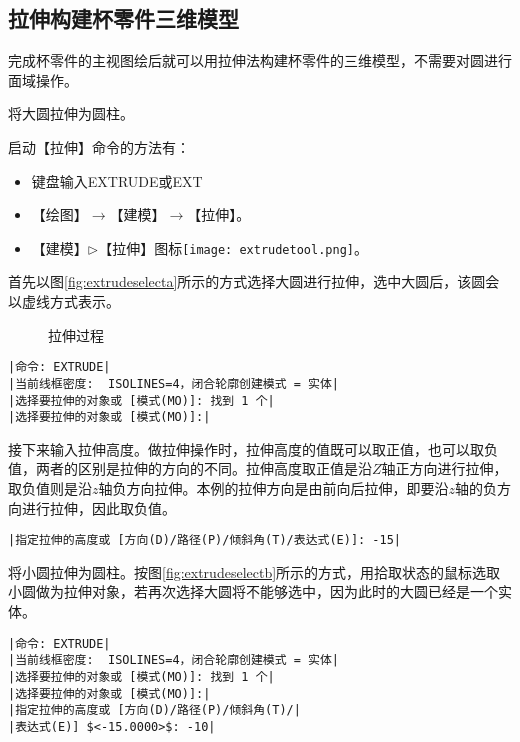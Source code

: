 \subsection{拉伸构建杯零件三维模型}
完成杯零件的主视图绘后就可以用拉伸法构建杯零件的三维模型，不需要对圆进行面域操作。
\begin{procedure}
\item 将大圆拉伸为圆柱。

启动【拉伸】命令的方法有：
\begin{itemize}
\item 键盘输入EXTRUDE或EXT
\item 【绘图】$\rightarrow$【建模】$\rightarrow$【拉伸】。
\item 【建模】$\triangleright$【拉伸】图标\texttt{[image: extrudetool.png]}。
\end{itemize}
首先以图\ref{fig:extrudeselecta}所示的方式选择大圆进行拉伸，选中大圆后，该圆会以虚线方式表示。
\begin{figure}[htbp]
\centering
{}\hspace{20pt}
\caption{拉伸过程}
\end{figure}
\begin{lstlisting}
|命令: EXTRUDE|
|当前线框密度:  ISOLINES=4，闭合轮廓创建模式 = 实体|
|选择要拉伸的对象或 [模式(MO)]: 找到 1 个|
|选择要拉伸的对象或 [模式(MO)]:|
\end{lstlisting}
接下来输入拉伸高度。做拉伸操作时，拉伸高度的值既可以取正值，也可以取负值，两者的区别是拉伸的方向的不同。拉伸高度取正值是沿$Z$轴正方向进行拉伸，取负值则是沿$z$轴负方向拉伸。本例的拉伸方向是由前向后拉伸，即要沿$z$轴的负方向进行拉伸，因此取负值。
\begin{lstlisting}
|指定拉伸的高度或 [方向(D)/路径(P)/倾斜角(T)/表达式(E)]: -15|
\end{lstlisting}
\item 将小圆拉伸为圆柱。按图\ref{fig:extrudeselectb}所示的方式，用拾取状态的鼠标选取小圆做为拉伸对象，若再次选择大圆将不能够选中，因为此时的大圆已经是一个实体。
\begin{lstlisting}
|命令: EXTRUDE|
|当前线框密度:  ISOLINES=4，闭合轮廓创建模式 = 实体|
|选择要拉伸的对象或 [模式(MO)]: 找到 1 个|
|选择要拉伸的对象或 [模式(MO)]:|
|指定拉伸的高度或 [方向(D)/路径(P)/倾斜角(T)/|
|表达式(E)] $<-15.0000>$: -10|
\end{lstlisting}


\end{procedure}
